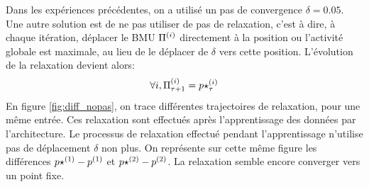 Dans les expériences précédentes, on a utilisé un pas de convergence $\delta=0.05$. Une autre solution est de ne pas utiliser de pas de relaxation, c'est à dire, à chaque itération, déplacer le BMU $\Pi^{({i})}$ directement à la position ou l'activité globale est maximale, au lieu de le déplacer de $\delta$ vers cette position.
L'évolution de la relaxation devient alors:
\begin{equation}
\forall i, \Pi^{({i})}_{\tau+1} = p\star^{({i})}_{\tau}
\end{equation}
En figure \ref{fig:diff_nopas}, on trace différentes trajectoires de relaxation, pour une même entrée. Ces relaxation sont effectués après l'apprentissage des données par l'architecture. Le processus de relaxation effectué pendant l'apprentissage n'utilise pas de déplacement $\delta$ non plus. 
On représente sur cette même figure les différences ${p\star}^{({1})} - p^{({1})}$ et ${p\star}^{({2})} - p^{({2})}$. La relaxation semble encore converger vers un point fixe.


